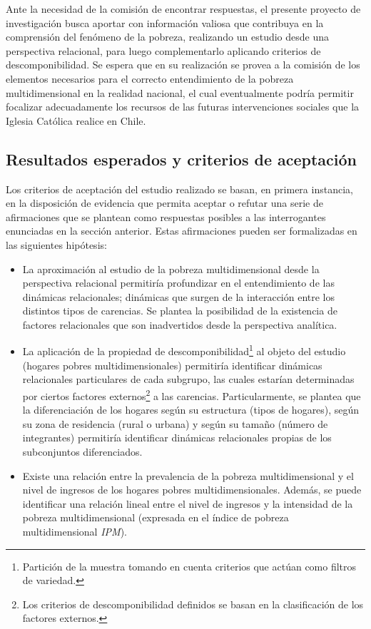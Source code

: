 \documentclass[12pt,letterpaper,spanish]{article}
\begin{document}
Ante la necesidad de la comisión de encontrar respuestas, el presente proyecto de investigación busca aportar con información valiosa que contribuya en la comprensión del fenómeno de la pobreza, realizando un estudio desde una perspectiva relacional, para luego complementarlo aplicando criterios de descomponibilidad. Se espera que en su realización se provea a la comisión de los elementos necesarios para el correcto entendimiento de la pobreza multidimensional en la realidad nacional, el cual eventualmente podría permitir focalizar adecuadamente los recursos de las futuras intervenciones sociales que la Iglesia Católica realice en Chile.

\subsection{Resultados esperados y criterios de aceptación}


Los criterios de aceptación del estudio realizado se basan, en primera instancia, en la disposición de evidencia que permita aceptar o refutar una serie de afirmaciones que se plantean como respuestas posibles a las interrogantes enunciadas en la sección anterior. Estas afirmaciones pueden ser formalizadas en las siguientes hipótesis:

\begin{itemize}
    \item La aproximación al estudio de la pobreza multidimensional desde la perspectiva relacional permitiría profundizar en el entendimiento de las dinámicas relacionales; dinámicas que surgen de la interacción entre los distintos tipos de carencias. Se plantea la posibilidad de la existencia de factores relacionales que son inadvertidos desde la perspectiva analítica. 
    
    \item La aplicación de la propiedad de descomponibilidad\footnote{Partición de la muestra tomando en cuenta criterios que actúan como filtros de variedad.} al objeto del estudio (hogares pobres multidimensionales) permitiría identificar dinámicas relacionales particulares de cada subgrupo, las cuales estarían determinadas por ciertos factores externos\footnote{Los criterios de descomponibilidad definidos se basan en la clasificación de los factores externos.} a las carencias. Particularmente, se plantea que la diferenciación de los hogares según su estructura (tipos de hogares), según su zona de residencia (rural o urbana) y según su tamaño (número de integrantes) permitiría identificar dinámicas relacionales propias de los subconjuntos diferenciados. 

    \item Existe una relación entre la prevalencia de la pobreza multidimensional y el nivel de ingresos de los hogares pobres multidimensionales. Además, se puede identificar una relación lineal entre el nivel de ingresos y  la intensidad de la pobreza multidimensional (expresada en el índice de pobreza multidimensional \textit{IPM}). 


\end{itemize}  
\end{document}
